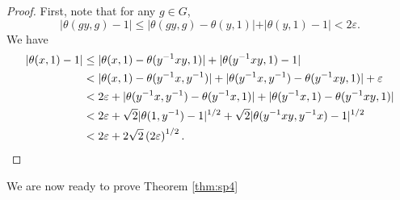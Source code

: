 \documentclass{article}
\theoremstyle{definition}
\theoremstyle{remark}
\numberwithin{equation}{section}
\begin{document}
\begin{proof}
First, note that for any $g\in G$, $$\vert\theta(gy,g)-1\vert\leq \vert\theta(gy,g)-\theta(y,1)\vert+\vert \theta(y,1) -1\vert<2\varepsilon.$$
We have \begin{align*}
   \vert \theta(x,1)-1\vert  & \leq  \vert \theta(x,1)-\theta(y^{-1}xy,1) \vert+\vert\theta(y^{-1}xy,1)-1\vert \\
     & <  \vert \theta(x,1) -\theta(y^{-1}x,y^{-1})\vert+\vert \theta(y^{-1}x,y^{-1})-\theta(y^{-1}xy,1) \vert+ \varepsilon \\
     & < 2\varepsilon + \vert \theta(y^{-1}x,y^{-1})-\theta(y^{-1}x,1) \vert +\vert \theta(y^{-1}x,1) -\theta(y^{-1}xy,1) \vert\\
     & < 2\varepsilon + \sqrt{2}\vert \theta(1,y^{-1})-1\vert^{1/2}+ \sqrt{2}\vert \theta(y^{-1}xy,y^{-1}x)-1\vert^{1/2}\\
     & < 2\varepsilon + 2\sqrt{2}\left(2\varepsilon\right)^{1/2}.\qedhere
\end{align*}
\end{proof}

We are now ready to prove Theorem \ref{thm:sp4}
\end{document}
